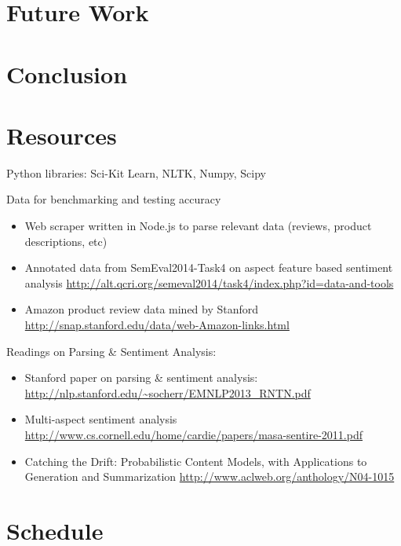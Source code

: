 \documentclass{article}
\begin{document}
\section{Future Work}
\section{Conclusion}
\section{Resources}

Python libraries: Sci-Kit Learn, NLTK, Numpy, Scipy

Data for benchmarking and testing accuracy

\begin{itemize}
\item Web scraper written in Node.js to parse relevant data (reviews, product descriptions, etc)
\newline 

\item Annotated data from SemEval2014-Task4 on aspect feature based sentiment analysis
\newline
\url{http://alt.qcri.org/semeval2014/task4/index.php?id=data-and-tools}

\item Amazon product review data mined by Stanford
\newline
\url{http://snap.stanford.edu/data/web-Amazon-links.html}
\end{itemize}

Readings on Parsing \& Sentiment Analysis:
\begin{itemize}
\item Stanford paper on parsing \& sentiment analysis:
\newline
\url{http://nlp.stanford.edu/~socherr/EMNLP2013_RNTN.pdf}

\item Multi-aspect sentiment analysis
\newline 
\url{http://www.cs.cornell.edu/home/cardie/papers/masa-sentire-2011.pdf}

\item Catching the Drift: Probabilistic Content Models, with Applications to
Generation and Summarization \newline
\url{http://www.aclweb.org/anthology/N04-1015}
\end{itemize}

\section{Schedule}
\end{document}
